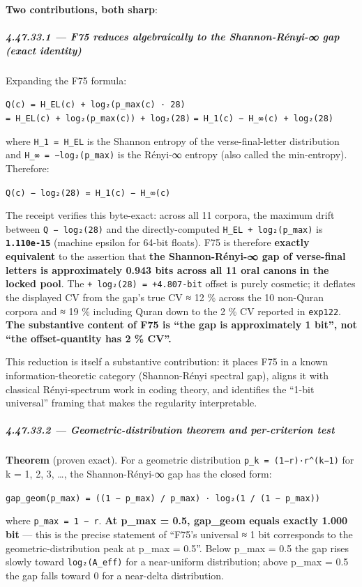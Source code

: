 \documentclass[
]{article}
\begin{document}
\textbf{Two contributions, both sharp}:

\subparagraph{4.47.33.1 --- F75 reduces algebraically to the
Shannon-Rényi-∞ gap (exact
identity)}\label{f75-reduces-algebraically-to-the-shannon-ruxe9nyi--gap-exact-identity}

Expanding the F75 formula:

\texttt{Q(c)\ =\ H\_EL(c)\ +\ log₂(p\_max(c)\ ·\ 28)}
\texttt{=\ H\_EL(c)\ +\ log₂(p\_max(c))\ +\ log₂(28)}
\texttt{=\ H\_1(c)\ −\ H\_∞(c)\ +\ log₂(28)}

where \texttt{H\_1\ =\ H\_EL} is the Shannon entropy of the
verse-final-letter distribution and \texttt{H\_∞\ =\ −log₂(p\_max)} is
the Rényi-∞ entropy (also called the min-entropy). Therefore:

\texttt{Q(c)\ −\ log₂(28)\ =\ H\_1(c)\ −\ H\_∞(c)}

The receipt verifies this byte-exact: across all 11 corpora, the maximum
drift between \texttt{Q\ −\ log₂(28)} and the directly-computed
\texttt{H\_EL\ +\ log₂(p\_max)} is \textbf{\texttt{1.110e-15}} (machine
epsilon for 64-bit floats). F75 is therefore \textbf{exactly equivalent}
to the assertion that \textbf{the Shannon-Rényi-∞ gap of verse-final
letters is approximately 0.943 bits across all 11 oral canons in the
locked pool}. The \texttt{+\ log₂(28)\ =\ +4.807-bit} offset is purely
cosmetic; it deflates the displayed CV from the gap's true CV ≈ 12 \%
across the 10 non-Quran corpora and ≈ 19 \% including Quran down to the
2 \% CV reported in \texttt{exp122}. \textbf{The substantive content of
F75 is ``the gap is approximately 1 bit'', not ``the offset-quantity has
2 \% CV''.}

This reduction is itself a substantive contribution: it places F75 in a
known information-theoretic category (Shannon-Rényi spectral gap),
aligns it with classical Rényi-spectrum work in coding theory, and
identifies the ``1-bit universal'' framing that makes the regularity
interpretable.

\subparagraph{4.47.33.2 --- Geometric-distribution theorem and
per-criterion
test}\label{geometric-distribution-theorem-and-per-criterion-test}

\textbf{Theorem} (proven exact). For a geometric distribution
\texttt{p\_k\ =\ (1−r)·r\^{}(k−1)} for k = 1, 2, 3, \ldots, the
Shannon-Rényi-∞ gap has the closed form:

\texttt{gap\_geom(p\_max)\ =\ ((1\ −\ p\_max)\ /\ p\_max)\ ·\ log₂(1\ /\ (1\ −\ p\_max))}

where \texttt{p\_max\ =\ 1\ −\ r}. \textbf{At p\_max = 0.5, gap\_geom
equals exactly 1.000 bit} --- this is the precise statement of ``F75's
universal ≈ 1 bit corresponds to the geometric-distribution peak at
p\_max = 0.5''. Below p\_max = 0.5 the gap rises slowly toward
\texttt{log₂(A\_eff)} for a near-uniform distribution; above p\_max =
0.5 the gap falls toward 0 for a near-delta distribution.
\end{document}
